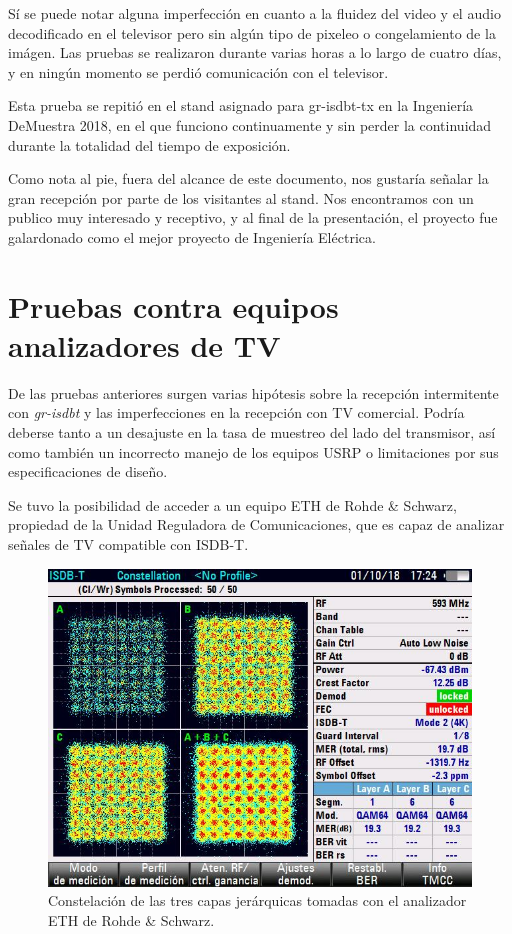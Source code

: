 Sí se puede notar alguna imperfección en cuanto a la fluidez del video y el audio decodificado en el televisor pero sin algún tipo de pixeleo o congelamiento de la imágen. Las pruebas se realizaron durante varias horas a lo largo de cuatro días, y en ningún momento se perdió comunicación con el televisor.

Esta prueba se repitió en el stand asignado para gr-isdbt-tx en la Ingeniería DeMuestra 2018, en el que funciono continuamente y sin perder la continuidad durante la totalidad del tiempo de exposición. 

Como nota al pie, fuera del alcance de este documento, nos gustaría señalar la gran recepción por parte de los visitantes al stand. Nos encontramos con un publico muy interesado y receptivo, y al final de la presentación, el proyecto fue galardonado como el mejor proyecto de Ingeniería Eléctrica.

\section{Pruebas contra equipos analizadores de TV}

De las pruebas anteriores surgen varias hipótesis sobre la recepción intermitente con \textit{gr-isdbt} y las imperfecciones en la recepción con TV comercial. Podría deberse tanto a un desajuste en la tasa de muestreo del lado del transmisor, así como también un incorrecto manejo de los equipos USRP o limitaciones por sus especificaciones de diseño.

Se tuvo la posibilidad de acceder a un equipo ETH de Rohde \& Schwarz, propiedad de la Unidad Reguladora de Comunicaciones, que es capaz de analizar señales de TV compatible con ISDB-T. 

\begin{figure}[!h]
	\centering
	\includegraphics[scale=0.6]{figuras/cap06/constelacion_eth}
	\caption{\label{f:calidad_imagen} Constelación de las tres capas jerárquicas tomadas con el analizador ETH de Rohde \& Schwarz.}
\end{figure}

